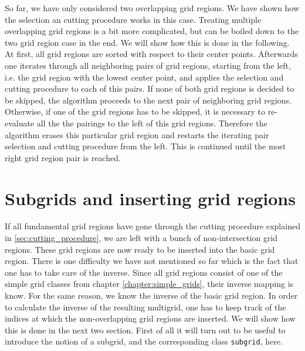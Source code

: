 So far, we have only considered two overlapping grid regions. We have shown how the selection an cutting procedure works in this case. Treating multiple overlapping grid regions is a bit more complicated, but can be boiled down to the two grid region case in the end. We will show how this is done in the following. At first, all grid regions are sorted with respect to their center points. Afterwards one iterates through all neighboring pairs of grid regions, starting from the left, i.e. the grid region with the lowest center point, and applies the selection and cutting procedure to each of this pairs. If none of both grid regions is decided to be skipped, the algorithm proceeds to the next pair of neighboring grid regions. Otherwise, if one of the grid regions has to be skipped, it is necessary to re-evaluate all the the pairings to the left of this grid regions. Therefore the algorithm erases this particular grid region and restarts the iterating pair selection and cutting procedure from the left. This is continued until the most right grid region pair is reached.



\section{Subgrids and inserting grid regions}\label{sec:subgrids_and_insert}
If all fundamental grid regions have gone through the cutting procedure explained in \ref{sec:cutting_procedure}, we are left with a bunch of non-intersection grid regions. These grid regions are now ready to be inserted into the basic grid region. There is one difficulty we have not mentioned so far which is the fact that one has to take care of the inverse. Since all grid regions consist of one of the simple grid classes from chapter \ref{chapter:simple_grids}, their inverse mapping is know. For the same reason, we know the inverse of the basic grid region. In order to calculate the inverse of the resulting multigrid, one has to keep track of the indices at which the non-overlapping grid regions are inserted. We will show how this is done in the next two section. First of all it will turn out to be useful to introduce the notion of a subgrid, and the corresponding class \texttt{subgrid}, here. 

